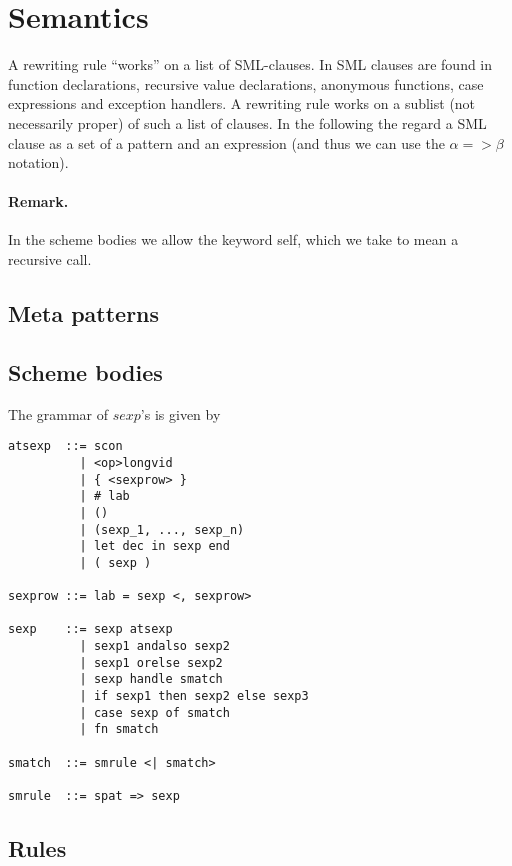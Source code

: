 \section{Semantics}
A rewriting rule ``works'' on a list of SML-clauses. In SML clauses are found in
function declarations, recursive value declarations, anonymous functions, case
expressions and exception handlers. A rewriting rule works on a sublist (not
necessarily proper) of such a list of clauses. In the following the regard a SML
clause as a set of a pattern and an expression (and thus we can use the $\alpha
=> \beta$ notation).

\paragraph{Remark.} In the scheme bodies we allow the keyword \textsf{self},
which we take to mean a recursive call.

\subsection{Meta patterns}

\subsection{Scheme bodies}

The grammar of $sexp$'s is given by
\begin{verbatim}
atsexp  ::= scon
          | <op>longvid
          | { <sexprow> }
          | # lab
          | ()
          | (sexp_1, ..., sexp_n)
          | let dec in sexp end
          | ( sexp )

sexprow ::= lab = sexp <, sexprow>

sexp    ::= sexp atsexp
          | sexp1 andalso sexp2
          | sexp1 orelse sexp2
          | sexp handle smatch
          | if sexp1 then sexp2 else sexp3
          | case sexp of smatch
          | fn smatch

smatch  ::= smrule <| smatch>

smrule  ::= spat => sexp
\end{verbatim}

\subsection{Rules}
\newcommand{\becomesthrough}[3]{#1 \textsf{ becomes } #2 \textsf{ through } #3}

